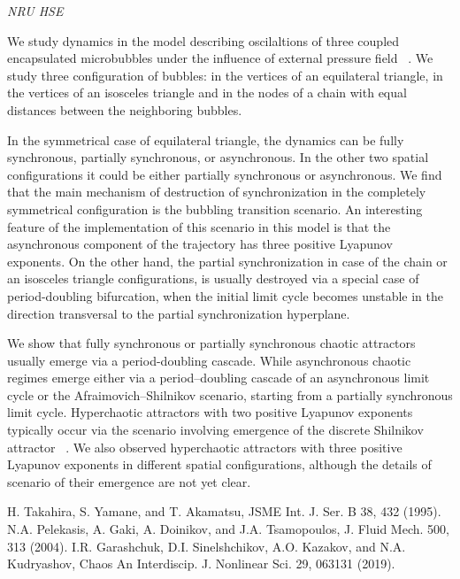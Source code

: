 

\begin{center}
	\maketitle
	{\large\textit{NRU HSE}}
\end{center}

We study dynamics in the model describing oscilaltions of three coupled encapsulated microbubbles under the influence of external pressure field ~\cite{Takahira1995, Doinikov2004}. We study three configuration of bubbles: in the vertices of an equilateral triangle, in the vertices of an isosceles triangle and in the nodes of a chain with equal distances between the neighboring bubbles.

In the symmetrical case of equilateral triangle, the dynamics can be fully synchronous, partially synchronous, or asynchronous. In the other two spatial configurations it could be either partially synchronous or asynchronous. We find that the main mechanism of destruction of synchronization in the completely symmetrical configuration is the bubbling transition scenario. An interesting feature of the implementation of this scenario in this model is that the asynchronous component of the trajectory has three positive Lyapunov exponents.
On the other hand, the partial synchronization in case of the chain or an isosceles triangle configurations, is usually destroyed via a special case of period-doubling bifurcation, when the initial limit cycle becomes unstable in the direction transversal to the partial synchronization hyperplane.

We show that fully synchronous or partially synchronous chaotic attractors usually emerge via a period-doubling cascade. While asynchronous chaotic regimes emerge either via a period--doubling cascade of an asynchronous limit cycle or the Afraimovich--Shilnikov scenario, starting from a partially synchronous limit cycle. Hyperchaotic attractors with two positive Lyapunov exponents typically occur via the scenario involving emergence of the discrete Shilnikov attractor ~\cite{Garashchuk2019}. We also observed hyperchaotic attractors with three positive Lyapunov exponents in different spatial configurations, although the details of scenario of their emergence are not yet clear.




\begin{thebibliography}{99}
 H. Takahira, S. Yamane, and T. Akamatsu, JSME Int. J. Ser. B 38, 432 (1995).
 N.A. Pelekasis, A. Gaki, A. Doinikov, and J.A. Tsamopoulos, J. Fluid Mech. 500, 313 (2004).
 I.R. Garashchuk, D.I. Sinelshchikov, A.O. Kazakov, and N.A. Kudryashov, Chaos An Interdiscip. J. Nonlinear Sci. 29, 063131 (2019).
\end{thebibliography}

